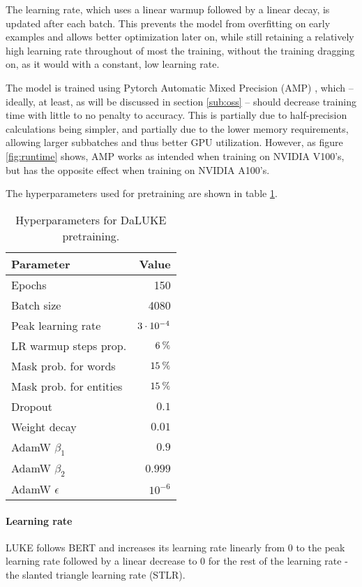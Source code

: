 \documentclass[main.tex]{subfiles}
\begin{document}
The learning rate, which uses a linear warmup followed by a linear decay, is updated after each batch.
This prevents the model from overfitting on early examples and allows better optimization later on, while still retaining a relatively high learning rate throughout of most the training, without the training dragging on, as it would with a constant, low learning rate.

The model is trained using Pytorch Automatic Mixed Precision (AMP) \cite{pytorchamp}, which -- ideally, at least, as will be discussed in section \ref{sub:oss} -- should decrease training time with little to no penalty to accuracy. \cite{huang2020amp}
This is partially due to half-precision calculations being simpler, and partially due to the lower memory requirements, allowing larger subbatches and thus better GPU utilization.
However, as figure \ref{fig:runtime} shows, AMP works as intended when training on NVIDIA V100's, but has the opposite effect when training on NVIDIA A100's.

The hyperparameters used for pretraining are shown in table \ref{tab:pretrain-hyper}.
\begin{table}[H]
    \centering
    \begin{tabular}{l|r}
        Parameter  &    Value\\\hline
        Epochs     & 150\\
        Batch size &    4080\\
        Peak learning rate & $3\cdot10^{-4}$\\
        LR warmup steps prop. & $ 6\:\text{\%{}} $\\
        Mask prob. for words & $ 15\:\text{\%{}} $\\
        Mask prob. for entities & $ 15\:\text{\%{}} $\\
        Dropout & $ 0.1 $\\
        Weight decay & $ 0.01 $\\
        AdamW $ \beta_1 $ & $ 0.9 $\\
        AdamW $ \beta_2 $ & $ 0.999 $\\
        AdamW $ \epsilon $ & $ 10^{-6} $
    \end{tabular}
    \caption{Hyperparameters for DaLUKE pretraining.}\label{tab:pretrain-hyper}
\end{table}\noindent

\paragraph{Learning rate}
LUKE follows BERT and increases its learning rate linearly from 0 to the peak learning rate followed by a linear decrease to 0 for the rest of the learning rate - the slanted triangle learning rate (STLR). \cite{devlin2019bert} \cite{yamada2020luke} \cite{howardruder2018universal}
\end{document}
